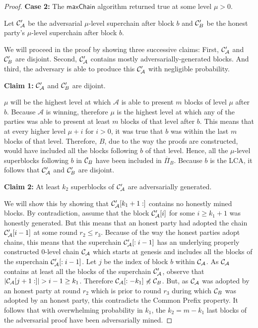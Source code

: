 \begin{proof}
    \textbf{Case 2:} The $\textsf{maxChain}$ algorithm returned true at some
    level $\mu > 0$.

    Let $\mathcal{C}'_\mathcal{A}$ be the adversarial $\mu$-level superchain after
    block $b$ and $\mathcal{C}'_B$ be the honest party's $\mu$-level superchain
    after block $b$.

    We will proceed in the proof by showing three successive claims: First,
    $\mathcal{C}'_\mathcal{A}$ and $\mathcal{C}'_B$ are disjoint. Second,
    $\mathcal{C}'_\mathcal{A}$ contains mostly adversarially-generated blocks. And
    third, the adversary is able to produce this $\mathcal{C}'_\mathcal{A}$ with
    negligible probability.

    \textbf{Claim 1: } $\mathcal{C}'_\mathcal{A}$ and $\mathcal{C}'_B$ are dijoint.

    $\mu$ will be the highest level at which $\mathcal{A}$ is able to present $m$
    blocks of level $\mu$ after $b$. Because $\mathcal{A}$ is winning,
    therefore $\mu$ is the highest level at which any of the parties was able
    to present at least $m$ blocks of that level after $b$.  This means that at
    every higher level $\mu + i$ for $i > 0$, it was true that $b$ was within
    the last $m$ blocks of that level.  Therefore, $B$, due to the way the
    proofs are constructed, would have included all the blocks following $b$ of
    that level. Hence, all the $\mu$-level superblocks following $b$ in
    $\mathcal{C}_B$ have been included in $\overline{\Pi}_B$. Because $b$ is the
    LCA, it follows that $\mathcal{C}'_\mathcal{A}$ and $\mathcal{C}'_B$ are disjoint.

    \textbf{Claim 2: } At least $k_2$ superblocks of $\mathcal{C}'_\mathcal{A}$ are
    adversarially generated.

    We will show this by showing that $\mathcal{C}'_\mathcal{A}[k_1 + 1:]$ contains
    no honestly mined blocks. By contradiction, assume that the block
    $\mathcal{C}'_\mathcal{A}[i]$ for some $i \geq k_1 + 1$ was honestly generated.
    But this means that an honest party had adopted the chain
    $\mathcal{C}'_\mathcal{A}[i - 1]$ at some round $r_2 \leq r_3$. Because of the
    way the honest parties adopt chains, this means that the superchain
    $\mathcal{C}'_\mathcal{A}[:i - 1]$ has an underlying properly constructed
    $0$-level chain $\mathcal{C}_\mathcal{A}$ which starts at genesis and includes
    all the blocks of the superchain $\mathcal{C}'_\mathcal{A}[:i - 1]$. Let $j$ be
    the index of block $b$ within $\mathcal{C}_\mathcal{A}$.  As
    $\mathcal{C}_\mathcal{A}$ contains at least all the blocks of the superchain
    $\mathcal{C}'_\mathcal{A}$, observe that $|\mathcal{C}_\mathcal{A}[j + 1:]| > i -
    1 \geq k_1$.  Therefore $\mathcal{C}_\mathcal{A}[:-k_1] \not\preccurlyeq
    \mathcal{C}_B$.  But, as $\mathcal{C}_\mathcal{A}$ was adopted by an honest party at
    round $r_2$ which is prior to round $r_3$ during which $\mathcal{C}_B$ was
    adopted by an honest party, this contradicts the Common Prefix property.
    It follows that with overwhelming probability in $k_1$, the $k_2 = m - k_1$
    last blocks of the adversarial proof have been adversarially mined.


\end{proof}
